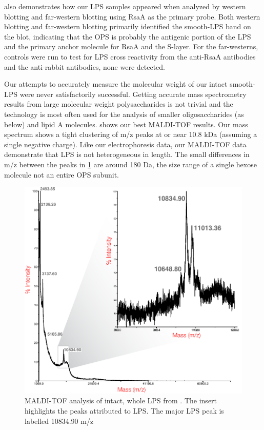  also demonstrates how our \ac{LPS} samples appeared when analyzed by western blotting and far-western blotting using RsaA as the primary probe. Both western blotting and far-western blotting primarily identified the smooth-\ac{LPS} band on the blot, indicating that the \ac{OPS} is probably the antigenic portion of the \ac{LPS} and the primary anchor molecule for RsaA and the \caulobacter{} \ac{S-layer}. For the far-westerns, controls were run to test for \ac{LPS} cross reactivity from the anti-RsaA antibodies and the anti-rabbit antibodies, none were detected. 

Our attempts  to accurately measure the molecular weight of our intact smooth-\ac{LPS} were never satisfactorily successful. Getting accurate mass spectrometry results from large molecular weight polysaccharides is not trivial and the technology is most often used for the analysis of smaller oligosaccharides (as below) and lipid A molecules.  shows our best \ac{MALDI-TOF} results. Our mass spectrum shows a tight clustering of m/z peaks at or near 10.8 kDa (assuming a single negative charge). Like our electrophoresis data, our \ac{MALDI-TOF} data demonstrate that \caulobacter{} \ac{LPS} is not heterogeneous in length. The small differences in m/z between the peaks in \cref{fig:lpsmalditof} are around 180 Da, the size range of a single hexose molecule not an entire \ac{OPS} subunit.

\begin{figure}[htb]
  \begin{center}
    \includegraphics[]{lps_chapter/img/malditof.pdf}
  \end{center}
  \caption[\Ac{MALDI-TOF} analysis of intact, whole \ac{LPS} from \caulobacter]{\ac{MALDI-TOF}
    analysis of intact, whole \ac{LPS} from \caulobacter. The insert highlights the peaks
    attributed to \ac{LPS}. The major \ac{LPS} peak is labelled 10834.90 m/z}
  \label{fig:lpsmalditof}
\end{figure}

